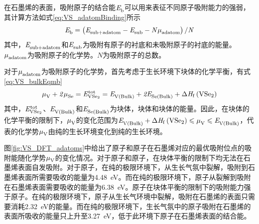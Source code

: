     在石墨烯的表面，吸附原子的结合能$\it E_{\rm b}^{\rm } \it$可以用来表征不同原子吸附能力的强弱，其计算方法如式\eqref{eq:VS_adatomBinding}所示\chinesecolon
    \begin{equation}
        \label{eq:VS_adatomBinding}
        \it E_{\rm b}^{\rm } \it=\left(\it E_{\rm sub+adatom}^{\rm } \it-\it E_{\rm sub}^{\rm } \it-N\it \mu_{\rm adatom}^{\rm } \it\right)/ N
    \end{equation}
    其中，$\it E_{\rm sub+adatom}^{\rm } \it$和$\it E_{\rm sub}^{\rm } \it$为吸附有原子的衬底和未吸附原子的衬底的能量。$\it \mu_{\rm adatom}^{\rm } \it$为吸附原子的化学势。$N$为吸附原子的总数。

    对于$\it \mu_{\rm adatom}^{\rm } \it$为吸附原子的化学势，首先考虑于生长环境下块体的化学平衡，有式\eqref{eq:VS_bulkEqmb}\chinesecolon
    \begin{equation}
        \label{eq:VS_bulkEqmb}
        \muVar{V}{}+2\muVar{Se}{}=\energyVar{\ce{VSe2}}{tot}=\energyVar{V\left(Bulk\right)}{}+2\energyVar{Se\left(Bulk\right)}{}+\rm{\Delta} \it H_{\rm f}\left(\ce{VSe2}\right)
    \end{equation}
    其中，$\energyVar{\ce{VSe2}}{tot}$、$\it E_{\rm V\left(Bulk\right)}^{\rm } \it$和$\it E_{\rm Se\left(Bulk\right)}^{\rm } \it$为块体，块体和块体的能量。因此，在块体的化学平衡的限制下，$\it \mu_{\rm V}^{\rm } \it$的变化范围为$\energyVar{V\left(Bulk\right)}{}+\rm{\Delta} \it H_{\rm f}\left(\ce{VSe2}\right) \leqslant \muVar{V}{}  \leqslant \energyVar{V\left(Bulk\right)}{}$，代表的化学势$\it \mu_{\rm V}^{\rm } \it$由纯的生长环境变化到纯的生长环境。

    图\ref{fig:VS_DFT_adatoms}中给出了原子和原子在石墨烯对应的最优吸附位点的吸附能随化学势$\it \mu_{\rm V}^{\rm } \it$的变化情况。对于原子和原子，在块体平衡的限制下均无法在石墨烯表面自发吸附。对于原子，在纯的极限环境下，从生长气氛中裂解，吸附到石墨烯表面所需要吸收的能量为\SI{4.48}{\electronvolt}。而在纯的极限环境下，原子从裂解到吸附在石墨烯表面需要吸收的能量为\SI{6.38}{\electronvolt}。原子在块体平衡的限制下的吸附能力强于原子。在纯的极限环境下，原子从生长气环境中裂解，吸附在石墨烯的表面只需要消耗\SI{2.32}{\electronvolt}的能量。而在纯的极限环境下，生长气氛中的原子吸附在石墨烯的表面所吸收的能量只上升至\SI{3.27}{\electronvolt}，低于此环境下原子在石墨烯表面的结合能。

